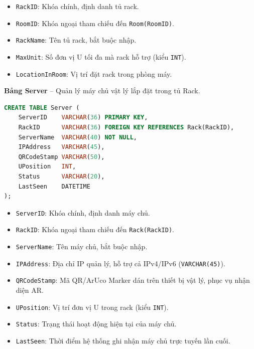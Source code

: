 \begin{itemize}[leftmargin=2em]
    \item \texttt{RackID}: Khóa chính, định danh tủ rack.
    \item \texttt{RoomID}: Khóa ngoại tham chiếu đến \texttt{Room(RoomID)}.
    \item \texttt{RackName}: Tên tủ rack, bắt buộc nhập.
    \item \texttt{MaxUnit}: Số đơn vị U tối đa mà rack hỗ trợ (kiểu \texttt{INT}).
    \item \texttt{LocationInRoom}: Vị trí đặt rack trong phòng máy.
\end{itemize}

\vspace{0.5em}
\noindent\textbf{Bảng Server} -- Quản lý máy chủ vật lý lắp đặt trong tủ Rack.

\begin{tcolorbox}[colback=gray!5, colframe=gray!60, title={\textbf{CREATE TABLE Server}}, fonttitle=\bfseries\small, boxrule=0.5pt, arc=2pt]
\begin{lstlisting}[language=SQL, basicstyle=\ttfamily\small, breaklines=true, showstringspaces=false, keywordstyle=\bfseries\color{blue!70!black}, stringstyle=\color{red!70!black}, commentstyle=\itshape\color{green!50!black}]
CREATE TABLE Server (
    ServerID    VARCHAR(36) PRIMARY KEY,
    RackID      VARCHAR(36) FOREIGN KEY REFERENCES Rack(RackID),
    ServerName  VARCHAR(40) NOT NULL,
    IPAddress   VARCHAR(45),
    QRCodeStamp VARCHAR(50),
    UPosition   INT,
    Status      VARCHAR(20),
    LastSeen    DATETIME
);
\end{lstlisting}
\end{tcolorbox}

\begin{itemize}[leftmargin=2em]
    \item \texttt{ServerID}: Khóa chính, định danh máy chủ.
    \item \texttt{RackID}: Khóa ngoại tham chiếu đến \texttt{Rack(RackID)}.
    \item \texttt{ServerName}: Tên máy chủ, bắt buộc nhập.
    \item \texttt{IPAddress}: Địa chỉ IP quản lý, hỗ trợ cả IPv4/IPv6 (\texttt{VARCHAR(45)}).
    \item \texttt{QRCodeStamp}: Mã QR/ArUco Marker dán trên thiết bị vật lý, phục vụ nhận diện AR.
    \item \texttt{UPosition}: Vị trí đơn vị U trong rack (kiểu \texttt{INT}).
    \item \texttt{Status}: Trạng thái hoạt động hiện tại của máy chủ.
    \item \texttt{LastSeen}: Thời điểm hệ thống ghi nhận máy chủ trực tuyến lần cuối.
\end{itemize}

